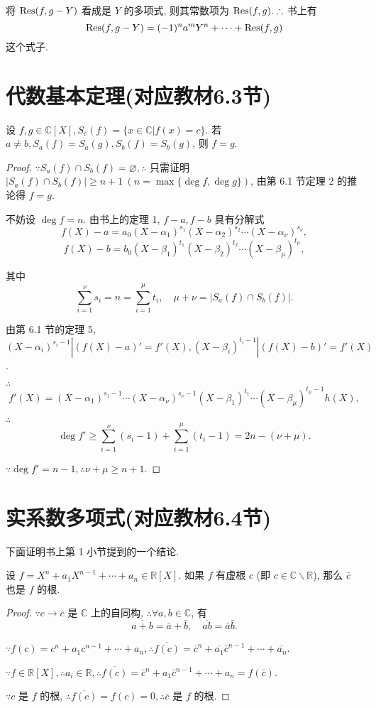 \documentclass[color=black,device=normal,lang=cn,mode=geye]{elegantnote}
\begin{document}
将 $\operatorname{Res} (f,g-Y)$ 看成是 $Y$ 的多项式, 则其常数项为 $\operatorname{Res} (f,g).\therefore$ 书上有
\[\operatorname{Res} (f,g-Y)=(-1)^na^mY^n+\cdots+\operatorname{Res} (f,g)\]
这个式子.
\section{代数基本定理(对应教材6.3节)}
\begin{theorem}[书上的例子的推广]
    设 $f,g\in\mathbb{C}[X],S_c(f)=\{x\in\mathbb{C}|f(x)=c\}$. 若 $a\neq b,S_a(f)=S_a(g),S_b(f)=S_b(g)$, 则 $f=g$.
\end{theorem}
\begin{proof}
    $\because S_a(f)\cap S_b(f)=\varnothing,\therefore$ 只需证明 $|S_a(f)\cap S_b(f)|\geq n+1\ (n=\max\{\deg f,\deg g\})$, 由第 6.1 节定理 2 的推论得 $f=g$.

    不妨设 $\deg f=n$. 由书上的定理 1, $f-a,f-b$ 具有分解式
    \[f(X)-a=a_0(X-\alpha_1)^{s_1}(X-\alpha_2)^{s_2}\cdots(X-\alpha_\nu)^{s_\nu},\]
    \[f(X)-b=b_0(X-\beta_1)^{t_1}(X-\beta_2)^{t_2}\cdots(X-\beta_\mu)^{t_\mu},\]

    其中
    \[\sum\limits_{i=1}^\nu s_i=n=\sum\limits_{i=1}^\mu t_i,\quad\mu+\nu=|S_a(f)\cap S_b(f)|.\]
    
    由第 6.1 节的定理 5, $(X-\alpha_i)^{s_i-1}|(f(X)-a)'=f'(X),(X-\beta_i)^{t_i-1}|(f(X)-b)'=f'(X)$.

    $\therefore$
    \[f'(X)=(X-\alpha_1)^{s_1-1}\cdots(X-\alpha_\nu)^{s_\nu-1}(X-\beta_1)^{t_1}\cdots(X-\beta_\mu)^{t_\mu-1}h(X),\]

    $\therefore$
    \[\deg f'\geq\sum\limits_{i=1}^\nu(s_i-1)+\sum\limits_{i=1}^\mu(t_i-1)=2n-(\nu+\mu).\]

    $\because\deg f'=n-1,\therefore\nu+\mu\geq n+1$.
\end{proof}
\section{实系数多项式(对应教材6.4节)}
下面证明书上第 1 小节提到的一个结论.
\begin{theorem}
    设 $f=X^n+a_1X^{n-1}+\cdots+a_n\in\mathbb{R}[X]$. 如果 $f$ 有虚根 $c$ (即 $c\in\mathbb{C}\backslash\mathbb{R}$), 那么 $\bar{c}$ 也是 $f$ 的根.
\end{theorem}
\begin{proof}
    $\because c\to\bar{c}$ 是 $\mathbb{C}$ 上的自同构, $\therefore\forall a,b\in\mathbb{C}$, 有
    \[\overline{a+b}=\bar{a}+\bar{b},\quad\overline{ab}=\bar{a}\bar{b}.\]

    $\because f(c)=c^n+a_1c^{n-1}+\cdots+a_n,\therefore\overline{f(c)}=\bar{c}^n+\overline{a_1}\bar{c}^{n-1}+\cdots+\overline{a_n}$.

    $\because f\in\mathbb{R}[X],\therefore a_i\in\mathbb{R},\therefore\overline{f(c)}=\bar{c}^n+a_1\bar{c}^{n-1}+\cdots+a_n=f(\bar{c})$.

    $\because c$ 是 $f$ 的根, $\therefore \overline{f(c)}=f(c)=0,\therefore\bar{c}$ 是 $f$ 的根.
\end{proof}
\end{document}

